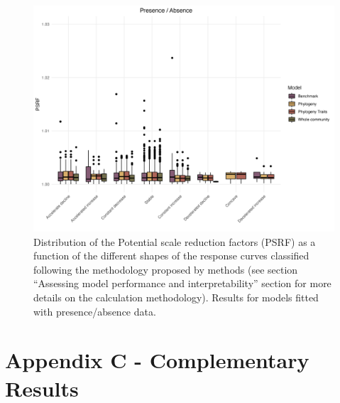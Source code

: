 \begin{figure}
\hypertarget{fig:chapt1supp16}{%
\centering
\includegraphics{03-Chapitre1/figures/supplementary/fig_supp16.png}
\caption{Distribution of the Potential scale reduction factors (PSRF) as
a function of the different shapes of the response curves classified
following the methodology proposed by \textcite{Rigal_2020} methods (see
section ``Assessing model performance and interpretability'' section for
more details on the calculation methodology). Results for models fitted
with presence/absence data.}\label{fig:chapt1supp16}
}
\end{figure}

\clearpage

\hypertarget{appendixC-chapter1}{%
\section*{Appendix C - Complementary Results}\label{appendixC-chapter1}}

